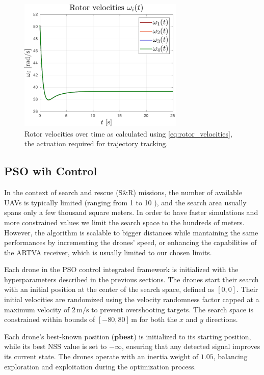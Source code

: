 \begin{figure}
    \centering
    \includegraphics[width=0.7\textwidth]{images/rotor_velocities.pdf}
    \caption[Rotor Velocities]{Rotor velocities over time as calculated using \eqref{eq:rotor_velocities}, the actuation required for trajectory tracking.}
    \label{fig:rotor_velocities}
\end{figure}

\newpage
\subsection{PSO wih Control}
In the context of search and rescue (S\&R) missions, the number of available 
UAVs is typically limited (ranging from 1 to 10 \cite{PSO_original}), and 
the search area 
usually spans only a few thousand square meters.
In order to have faster simulations and more constrained 
values we limit the search space 
to the hundreds of meters.
However, the algorithm is scalable to bigger distances while mantaining the same
performances by incrementing the drones' speed, or enhancing the capabilities
of the ARTVA receiver, which is usually limited to our chosen limits.

Each drone in the PSO control integrated framework is 
initialized with the hyperparameters described in the previous sections. 
The drones start their search with an initial position at the 
center of the search space, defined as \([0, 0]\). 
Their initial velocities are randomized using the velocity randomness
factor capped at a maximum velocity of \(2 \, \text{m/s}\) 
to prevent overshooting targets. The search space is constrained within bounds 
of \([-80, 80] \, \text{m}\) for both the \(x\) and \(y\) directions.

Each drone's best-known position ($\mathbf{pbest}$) is initialized 
to its starting position, while its best NSS
value is set to \(-\infty\), ensuring that any detected signal improves 
its current state. The drones operate with an inertia weight of \(1.05\), 
balancing exploration and exploitation during the optimization process. 

